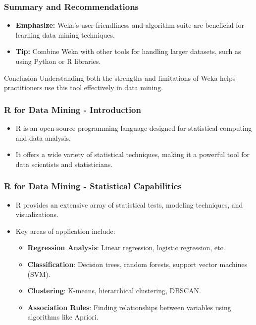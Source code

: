 \documentclass[aspectratio=169]{beamer}
\begin{document}
\begin{frame}[fragile]
    \frametitle{Summary and Recommendations}
    \begin{itemize}
        \item \textbf{Emphasize:} Weka’s user-friendliness and algorithm suite are beneficial for learning data mining techniques.
        \item \textbf{Tip:} Combine Weka with other tools for handling larger datasets, such as using Python or R libraries.
    \end{itemize}
    \begin{block}{Conclusion}
        Understanding both the strengths and limitations of Weka helps practitioners use this tool effectively in data mining.
    \end{block}
\end{frame}

\begin{frame}[fragile]
  \frametitle{R for Data Mining - Introduction}
  \begin{itemize}
    \item R is an open-source programming language designed for statistical computing and data analysis.
    \item It offers a wide variety of statistical techniques, making it a powerful tool for data scientists and statisticians.
  \end{itemize}
\end{frame}

\begin{frame}[fragile]
  \frametitle{R for Data Mining - Statistical Capabilities}
  \begin{itemize}
    \item R provides an extensive array of statistical tests, modeling techniques, and visualizations.
    \item Key areas of application include:
      \begin{itemize}
        \item \textbf{Regression Analysis}: Linear regression, logistic regression, etc.
        \item \textbf{Classification}: Decision trees, random forests, support vector machines (SVM).
        \item \textbf{Clustering}: K-means, hierarchical clustering, DBSCAN.
        \item \textbf{Association Rules}: Finding relationships between variables using algorithms like Apriori.
      \end{itemize}
  \end{itemize}
\end{frame}
\end{document}
